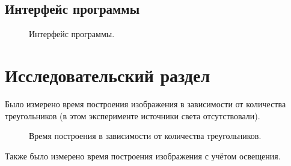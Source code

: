 \documentclass[14pt,a4paper]{extarticle}
\begin{document}
	\subsection{Интерфейс программы}
		\begin{figure}[H]	
			\noindent{}
			\caption{Интерфейс программы.}
			\label{Window1}
		\end{figure}
\clearpage
\section{Исследовательский раздел}
	Было измерено время построения изображения в зависимости от количества треугольников (в этом эксперименте источники света отсутствовали).
	
	\begin{figure}[H]
		\label{graphic1}
		\centering
		\caption{Время построения в зависимости от количества треугольников.}
	\end{figure}
	
	Также было измерено время построения изображения с учётом освещения.
	
\end{document}
